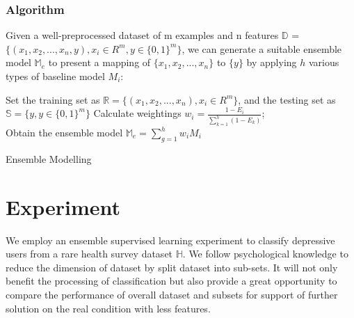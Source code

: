 \documentclass[10pt,journal,compsoc]{IEEEtran}
\begin{document}
\subsubsection{Algorithm}
Given a well-preprocessed dataset of m examples and n features $\mathbb{D}$ = $\displaystyle \big\{ (x_{1}, x_{2}, ... , x_{n}, y ), x_{i} \in R^{m}, y \in {\{0, 1\}}^{m}  \big\}$, we can generate a suitable ensemble model $\mathbb{M}_{e} $ to present a mapping of $\big\{ x_{1}, x_{2}, ... , x_{n} \big\}$ to $\big\{ y \big\}$ by applying $h$ various types of baseline model $M_{i}$:\\
\IncMargin{2em}
\begin{algorithm}[h]
\BlankLine
Set the training set as $\mathbb{R} = \big\{ (x_{1}, x_{2}, ... , x_{n} ), x_{i} \in R^{m} \big\}$, and the testing set as $\mathbb{S} = \big\{  y, y \in {\{0, 1\}}^{m}  \big\}$\;
Calculate weightings $w_{i} = \frac{1 - E_{i} }{\sum_{k = 1}^{h} (1 - E_{k}) }$; \\
Obtain the ensemble model $\mathbb{M}_{e} = \sum_{g = 1}^{h} w_{i} M_{i} $\;
\caption{Ensemble Modelling}\label{ensemble}
\end{algorithm}\DecMargin{2em}
%
%
%
%
%
%
\section{Experiment}
We employ an ensemble supervised learning experiment to classify depressive users from a rare health survey dataset $\mathbb{H}$. We follow psychological knowledge to reduce the dimension of dataset by split dataset into sub-sets. It will not only benefit the processing of classification but also provide a great opportunity to compare the performance of overall dataset and subsets for support of further solution on the real condition with less features.
\end{document}

